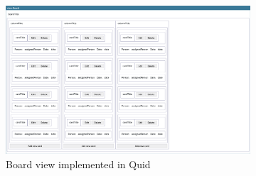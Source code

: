 \begin{figure}
    \centering
    \begin{subfigure}[m]{0.6\textwidth}
        \centering
        \includegraphics[height=0.25\textheight]{./4-results-and-discussion/quid-board-view}
        \caption{Board view implemented in Quid}
        \label{fig:4-1-quid-board-view}
    \end{subfigure}
    \hfill
    \begin{subfigure}[m]{0.35\textwidth}
        \centering

\end{subfigure}
\end{figure}
